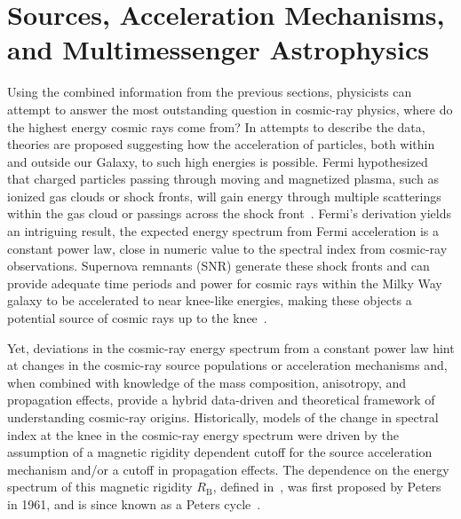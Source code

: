 


\section{Sources, Acceleration Mechanisms, and Multimessenger Astrophysics}\label{sec:sources}
Using the combined information from the previous sections, physicists can attempt to answer the most outstanding question in cosmic-ray physics, where do the highest energy cosmic rays come from?
In attempts to describe the data, theories are proposed suggesting how the acceleration of particles, both within and outside our Galaxy, to such high energies is possible.
Fermi hypothesized that charged particles passing through moving and magnetized plasma, such as ionized gas clouds or shock fronts, will gain energy through multiple scatterings within the gas cloud or passings across the shock front~\cite{fermi_acceleration}.
Fermi's derivation yields an intriguing result, the expected energy spectrum from Fermi acceleration is a constant power law, close in numeric value to the spectral index from cosmic-ray observations.
Supernova remnants (SNR) generate these shock fronts and can provide adequate time periods and power for cosmic rays within the Milky Way galaxy to be accelerated to near knee-like energies, making these objects a potential source of cosmic rays up to the knee~\cite{jorg_astropartphys2004_kneemodels}.

Yet, deviations in the cosmic-ray energy spectrum from a constant power law hint at changes in the cosmic-ray source populations or acceleration mechanisms and, when combined with knowledge of the mass composition, anisotropy, and propagation effects, provide a hybrid data-driven and theoretical framework of understanding cosmic-ray origins.
Historically, models of the change in spectral index at the knee in the cosmic-ray energy spectrum were driven by the assumption of a magnetic rigidity dependent cutoff for the source acceleration mechanism and/or a cutoff in propagation effects.
The dependence on the energy spectrum of this magnetic rigidity $R_{\text{B}}$, defined in~, was first proposed by Peters in 1961, and is since known as a Peters cycle~\cite{peters_1961}.

